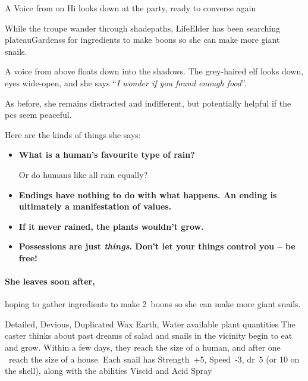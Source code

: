 \begin{multicols}{2}
{A Voice from on Hi}%
{ looks down at the party, ready to converse again}%

While the troupe wander through \gls{shadepaths}, \gls{LifeElder} has been searching \glspl{plateauGardens} for \glspl{ingredient} to make \glspl{boon} so she can make more giant snails.

\begin{boxtext}
  A voice from above floats down into the shadows.
  The grey-haired elf looks down, eyes wide-open, and she says ``\textit{I wonder if you found enough food}''.
\end{boxtext}

As before, she remains distracted and indifferent, but potentially helpful if the \glspl{pc} seem peaceful.

Here are the kinds of things she says:

\begin{itemize}
  \item[\adforn{54}]\bf
  What is a human's favourite type of rain?

  Or do humans like all rain equally?
  \item[\adforn{54}]\bf
  Endings have nothing to do with what happens.
  An ending is ultimately a manifestation of values.
  \item[\adforn{54}]\bf
  If it never rained, the plants wouldn't grow.
  \item[\adforn{54}]\bf
  Possessions are just \emph{things}.
  Don't let your things control you -- be free!
\end{itemize}

\paragraph{She leaves soon after,}
hoping to gather \glspl{ingredient} to make 2~\glspl{boon} so she can make more giant snails.

  {Detailed, Devious, Duplicated}%
  {Wax}%
  {Earth, Water}%
  {available plant quantities}%
  {The caster thinks about past dreams of salad and  snails in the vicinity begin to eat and grow.
  Within a few days, they reach the size of a human, and after one \showOnset\ reach the size of a house.
  Each snail has Strength~+5, Speed~-3, \gls{dr}~5 (or 10 on the shell), along with the abilities Viscid and Acid Spray}%
  {}


\end{multicols}
